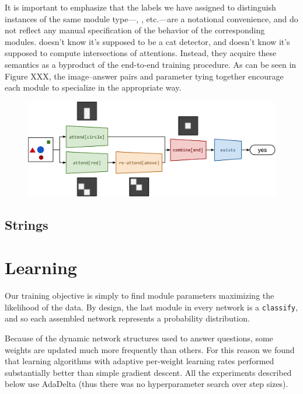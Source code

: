 \documentclass[10pt,twocolumn,letterpaper]{article}
\begin{document}
It is important to emphasize that the labels we have assigned to distinguish
instances of the same module type---, , etc.---are a
notational convenience, and do not reflect any manual specification of the
behavior of the corresponding modules.  doesn't know it's
supposed to be a cat detector, and  doesn't know it's supposed
to compute intersections of attentions. Instead, they acquire these semantics as
a byproduct of the end-to-end training procedure. As can be seen in Figure XXX,
the image--answer pairs and parameter tying together encourage each module to
specialize in the appropriate way.

\begin{figure}
    \includegraphics[width=\textwidth]{fig/full2}
\end{figure}

\subsection{Strings}

\section{Learning}

Our training objective is simply to find module parameters maximizing the
likelihood of the data. By design, the last module in every network is a
{\small\tt classify}, and so each assembled network represents a probability
distribution.

Because of the dynamic network structures used to answer questions, some weights
are updated much more frequently than others. For this reason we found that
learning algorithms with adaptive per-weight learning rates performed
substantially better than simple gradient descent. All the experiments described
below use AdaDelta (thus there was no hyperparameter search over step sizes).

\end{document}

